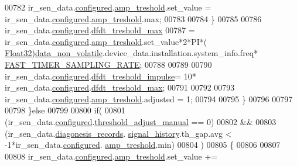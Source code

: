 \begin{DoxyCode}
00782                              ir\_sen\_data.\hyperlink{a00023_a94b2d1f6ea4ab334c74d24984dd27843}{configured}.\hyperlink{a00021_a4b3bbfb0267daea1432f2603825ade62}{amp\_treshold}.set\_value = 
      ir\_sen\_data.\hyperlink{a00023_a94b2d1f6ea4ab334c74d24984dd27843}{configured}.\hyperlink{a00021_a4b3bbfb0267daea1432f2603825ade62}{amp\_treshold}.max;
00783                             
00784                          \}
00785                   
00786                       ir\_sen\_data.\hyperlink{a00023_a94b2d1f6ea4ab334c74d24984dd27843}{configured}.\hyperlink{a00021_adf9a37828e447378b1d533185213316d}{dfdt\_treshold\_max}
00787                         = ir\_sen\_data.\hyperlink{a00023_a94b2d1f6ea4ab334c74d24984dd27843}{configured}.\hyperlink{a00021_a4b3bbfb0267daea1432f2603825ade62}{amp\_treshold}.set\_value*2*PI*(
      \hyperlink{a00072_a87d38f886e617ced2698fc55afa07637}{Float32})\hyperlink{a00060_a76ac5f917f5308dcd83de0d7c94559fb}{data\_non\_volatile}.device\_data.installation.system\_info.freq*
      \hyperlink{a00021_a3a4dcb8af26a561d90607a41a3745806}{FAST\_TIMER\_SAMPLING\_RATE};
00788 
00789 
00790                      ir\_sen\_data.\hyperlink{a00023_a94b2d1f6ea4ab334c74d24984dd27843}{configured}.\hyperlink{a00021_a3b9c683370c94430a4c6a9d78ce6f5ef}{dfdt\_treshold\_impulse}= 10*
      ir\_sen\_data.\hyperlink{a00023_a94b2d1f6ea4ab334c74d24984dd27843}{configured}.\hyperlink{a00021_adf9a37828e447378b1d533185213316d}{dfdt\_treshold\_max};
00791                      
00792 
00793                      ir\_sen\_data.\hyperlink{a00023_a94b2d1f6ea4ab334c74d24984dd27843}{configured}.\hyperlink{a00021_a4b3bbfb0267daea1432f2603825ade62}{amp\_treshold}.adjusted = 1;
00794 
00795                  \}
00796 
00797 
00798                 \}\textcolor{keywordflow}{else}
00799 
00800                 \textcolor{keywordflow}{if}(
00801                   (ir\_sen\_data.\hyperlink{a00023_a94b2d1f6ea4ab334c74d24984dd27843}{configured}.\hyperlink{a00021_a18e270a10094f045f20299b0f7e83085}{threshold\_adjust\_manual} == 0)
00802                     &&
00803                   (ir\_sen\_data.\hyperlink{a00023_a7ae905b560513ad201e58c2f63375030}{diagonesis\_records}.
      \hyperlink{a00017_affb63906d23cb1cb7787d61eaaedfb60}{signal\_history}.th\_gap.avg < -1*ir\_sen\_data.\hyperlink{a00023_a94b2d1f6ea4ab334c74d24984dd27843}{configured}.
      \hyperlink{a00021_a4b3bbfb0267daea1432f2603825ade62}{amp\_treshold}.min)
00804                   )
00805                   \{
00806 
00807 
00808                       ir\_sen\_data.\hyperlink{a00023_a94b2d1f6ea4ab334c74d24984dd27843}{configured}.\hyperlink{a00021_a4b3bbfb0267daea1432f2603825ade62}{amp\_treshold}.set\_value  +=

\end{DoxyCode}

